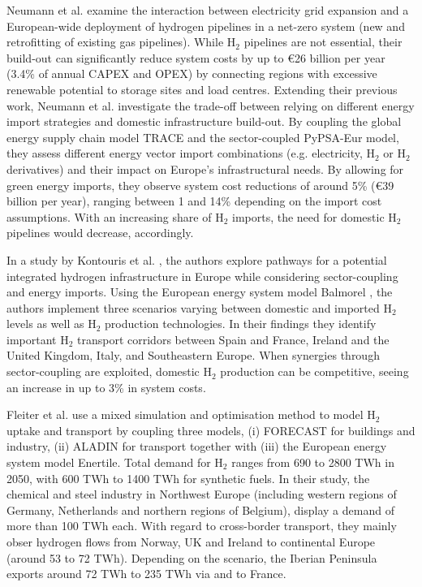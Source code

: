 \documentclass[pdflatex,sn-nature]{sn-jnl}%
\theoremstyle{thmstyleone}%
\theoremstyle{thmstyletwo}%
\theoremstyle{thmstylethree}%
\begin{document}
Neumann et al. \cite{neumannPotentialRoleHydrogen2023} examine the interaction between electricity grid expansion and a European-wide deployment of hydrogen pipelines in a net-zero system (new and retrofitting of existing gas pipelines). While H$_2$ pipelines are not essential, their build-out can significantly reduce system costs by up to €26 billion per year (3.4\% of annual CAPEX and OPEX) by connecting regions with excessive renewable potential to storage sites and load centres. 
Extending their previous work, Neumann et al. \cite{neumannEnergyImportsInfrastructure2024} investigate the trade-off between relying on different energy import strategies and domestic infrastructure build-out. By coupling the global energy supply chain model TRACE \cite{hamppImportOptionsChemical2023} and the sector-coupled PyPSA-Eur model, they assess different energy vector import combinations (e.g. electricity, H$_2$ or H$_2$ derivatives) and their impact on Europe's infrastructural needs. 
By allowing for green energy imports, they observe system cost reductions of around 5\% (€39 billion per year), ranging between 1 and 14\% depending on the import cost assumptions. With an increasing share of H$_2$ imports, the need for domestic H$_2$ pipelines would decrease, accordingly.

In a study by Kontouris et al. \cite{kountourisUnifiedEuropeanHydrogen2024}, the authors explore pathways for a potential integrated hydrogen infrastructure in Europe while considering sector-coupling and energy imports. Using the European energy system model Balmorel \cite{wieseBalmorelOpenSource2018}, the authors implement three scenarios varying between domestic and imported H$_2$ levels as well as H$_2$ production technologies. In their findings they identify important H$_2$ transport corridors between Spain and France, Ireland and the United Kingdom, Italy, and Southeastern Europe. When synergies through sector-coupling are exploited, domestic H$_2$ production can be competitive, seeing an increase in up to 3\% in system costs.

Fleiter et al. \cite{fleiterHydrogenInfrastructureFuture2025} use a mixed simulation and optimisation method to model H$_2$ uptake and transport by coupling three models, (i) FORECAST for buildings and industry, (ii) ALADIN for transport together with (iii) the European energy system model Enertile. Total demand for H$_2$ ranges from 690 to 2800 TWh in 2050, with 600 TWh to 1400 TWh for synthetic fuels. In their study, the  chemical and steel industry in Northwest Europe (including western regions of Germany, Netherlands and northern regions of Belgium), display a demand of more than 100 TWh each. With regard to cross-border transport, they mainly obser hydrogen flows from Norway, UK and Ireland to continental Europe (around 53 to 72 TWh). Depending on the scenario, the Iberian Peninsula exports around 72 TWh to 235 TWh via and to France.
\end{document}
